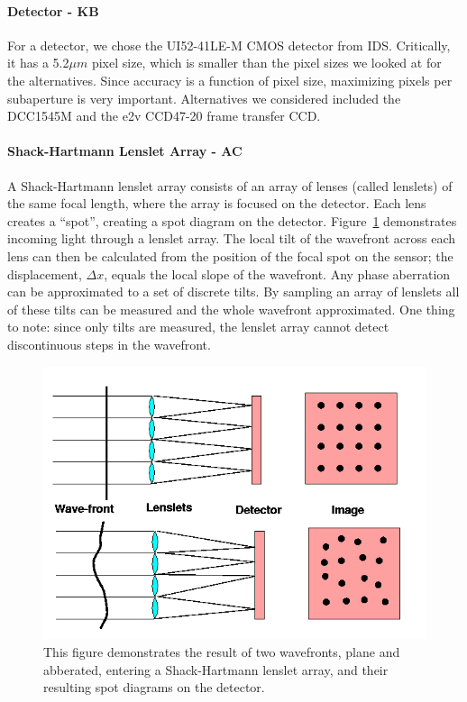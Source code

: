 \documentclass[12pt]{article}
\begin{document}
\paragraph{Detector - KB}

For a detector, we chose the UI52-41LE-M CMOS detector from IDS. Critically, it has a 5.2$\mu m$ pixel size, which is smaller than the pixel sizes we looked at for the alternatives. Since accuracy is a function of pixel size, maximizing pixels per subaperture is very important. Alternatives we considered included the DCC1545M and the e2v CCD47-20 frame transfer CCD. 

\paragraph{Shack-Hartmann Lenslet Array - AC}

A Shack-Hartmann lenslet array consists of an array of lenses (called lenslets) of the same focal length, where the array is focused on the detector. Each lens creates a “spot”, creating a spot diagram on the detector. Figure~\ref{fig:lenslet_array} demonstrates incoming light through a lenslet array. The local tilt of the wavefront across each lens can then be calculated from the position of the focal spot on the sensor; the displacement, $\Delta x$, equals the local slope of the wavefront. Any phase aberration can be approximated to a set of discrete tilts. By sampling an array of lenslets all of these tilts can be measured and the whole wavefront approximated. One thing to note: since only tilts are measured, the lenslet array cannot detect discontinuous steps in the wavefront.

\begin{figure}[ht]
\centering
  \includegraphics[width=5in]{images/payload_SH.png}
\caption{This figure demonstrates the result of two wavefronts, plane and abberated, entering a Shack-Hartmann lenslet array, and their resulting spot diagrams on the detector.}
\label{fig:lenslet_array}
\end{figure}
\end{document}
